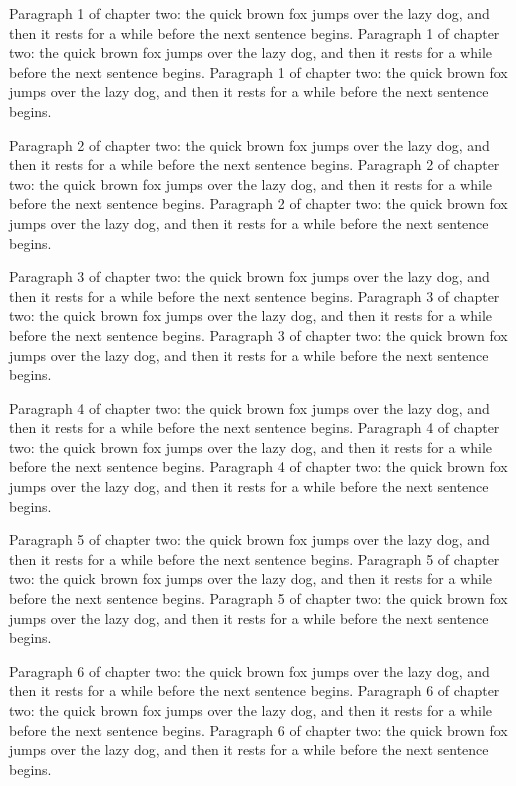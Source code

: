 Paragraph 1 of chapter two: the quick brown fox jumps over the lazy dog, and then it rests for a while before the next sentence begins. Paragraph 1 of chapter two: the quick brown fox jumps over the lazy dog, and then it rests for a while before the next sentence begins. Paragraph 1 of chapter two: the quick brown fox jumps over the lazy dog, and then it rests for a while before the next sentence begins. 

Paragraph 2 of chapter two: the quick brown fox jumps over the lazy dog, and then it rests for a while before the next sentence begins. Paragraph 2 of chapter two: the quick brown fox jumps over the lazy dog, and then it rests for a while before the next sentence begins. Paragraph 2 of chapter two: the quick brown fox jumps over the lazy dog, and then it rests for a while before the next sentence begins. 

Paragraph 3 of chapter two: the quick brown fox jumps over the lazy dog, and then it rests for a while before the next sentence begins. Paragraph 3 of chapter two: the quick brown fox jumps over the lazy dog, and then it rests for a while before the next sentence begins. Paragraph 3 of chapter two: the quick brown fox jumps over the lazy dog, and then it rests for a while before the next sentence begins. 

Paragraph 4 of chapter two: the quick brown fox jumps over the lazy dog, and then it rests for a while before the next sentence begins. Paragraph 4 of chapter two: the quick brown fox jumps over the lazy dog, and then it rests for a while before the next sentence begins. Paragraph 4 of chapter two: the quick brown fox jumps over the lazy dog, and then it rests for a while before the next sentence begins. 

Paragraph 5 of chapter two: the quick brown fox jumps over the lazy dog, and then it rests for a while before the next sentence begins. Paragraph 5 of chapter two: the quick brown fox jumps over the lazy dog, and then it rests for a while before the next sentence begins. Paragraph 5 of chapter two: the quick brown fox jumps over the lazy dog, and then it rests for a while before the next sentence begins. 

Paragraph 6 of chapter two: the quick brown fox jumps over the lazy dog, and then it rests for a while before the next sentence begins. Paragraph 6 of chapter two: the quick brown fox jumps over the lazy dog, and then it rests for a while before the next sentence begins. Paragraph 6 of chapter two: the quick brown fox jumps over the lazy dog, and then it rests for a while before the next sentence begins. 

